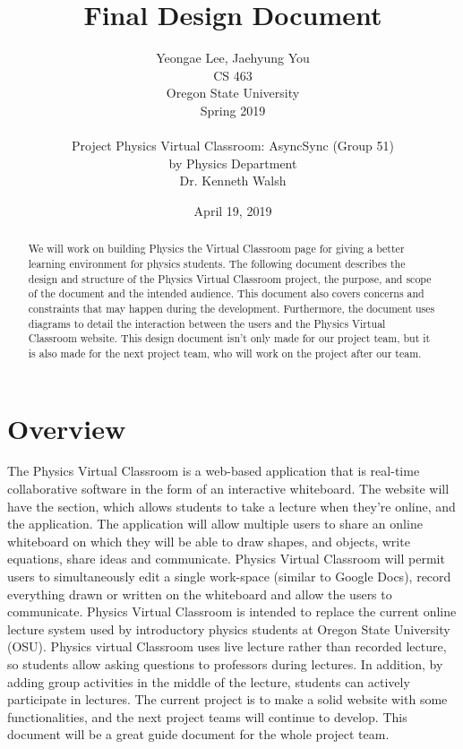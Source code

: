 \documentclass[10pt]{article}
\begin{document}
\begin{titlepage}
    \title{Final Design Document}
    \author{Yeongae Lee, Jaehyung You \\ CS 463  \\ Oregon State University \\ Spring 2019 \\ \\ Project Physics Virtual Classroom: AsyncSync (Group 51) \\by Physics Department \\Dr. Kenneth Walsh}
    \date {April 19, 2019}


    \maketitle
        \begin{abstract}

        We will work on building Physics the Virtual Classroom page for giving a better learning environment for physics students. The following document describes the design and structure of the Physics Virtual Classroom project, the purpose, and scope of the document and the intended audience. This document also covers concerns and constraints that may happen during the development. Furthermore, the document uses diagrams to detail the interaction between the users and the Physics Virtual Classroom website. This design document isn't only made for our project team, but it is also made for the next project team, who will work on the project after our team.

        \end{abstract}

\end{titlepage}
\newpage


\section{Overview}
    The Physics Virtual Classroom is a web-based application that is real-time collaborative software in the form of an interactive whiteboard. The website will have the section, which allows students to take a lecture when they’re online, and the application. The application will allow multiple users to share an online whiteboard on which they will be able to draw shapes, and objects, write equations, share ideas and communicate. Physics Virtual Classroom will permit users to simultaneously edit a single work-space (similar to Google Docs), record everything drawn or written on the whiteboard and allow the users to communicate. Physics Virtual Classroom is intended to replace the current online lecture system used by introductory physics students at Oregon State University (OSU). Physics virtual Classroom uses live lecture rather than recorded lecture, so students allow asking questions to professors during lectures. In addition, by adding group activities in the middle of the lecture, students can actively participate in lectures. The current project is to make a solid website with some functionalities, and the next project teams will continue to develop. This document will be a great guide document for the whole project team.
\end{document}
